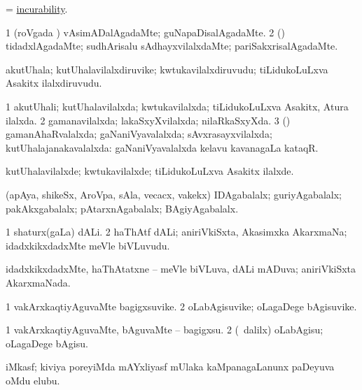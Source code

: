 \bentry
{}
\gl{\nA}
\bmng
 = \hyperlink{incurability}{incurability}. 
\emng
\eentry

\bentry
{}
\gl{\kirxvi}
\bmng
\bnum
\num{1} (roVgada \vi) vAsimADalAgadaMte; guNapaDisalAgadaMte. 
\num{2} (\rUpa) tidadxlAgadaMte; sudhArisalu sAdhayxvilalxdaMte; pariSakxrisalAgadaMte. 
\enum
\emng
\eentry

\bentry
{}
\gl{\nA}
\bmng
akutUhala; kutUhalavilalxdiruvike; kwtukavilalxdiruvudu; tiLidukoLuLxva Asakitx ilalxdiruvudu. 
\emng
\eentry

\bentry
{}
\gl{\gu}
\bmng
\bnum
\num{1} akutUhali; kutUhalavilalxda; kwtukavilalxda; tiLidukoLuLxva Asakitx, Atura ilalxda. 
\num{2} gamanavilalxda; lakaSxyXvilalxda; nilaRkaSxyXda. 
\num{3} (\viparx) gamanAhaRvalalxda; gaNaniVyavalalxda; sAvxrasayxvilalxda; kutUhalajanakavalalxda:  gaNaniVyavalalxda kelavu kavanagaLa kataqR. 
\enum
\emng
\eentry

\bentry
{}
\gl{\kirxvi}
\bmng
kutUhalavilalxde; kwtukavilalxde; tiLidukoLuLxva Asakitx ilalxde. 
\emng
\eentry

\bentry
{}
\gl{\gu}
\bmng
(apAya, shikeSx, AroVpa, sAla, vecacx, \mo vakekx) IDAgabalalx; guriyAgabalalx; pakAkxgabalalx; pAtarxnAgabalalx; BAgiyAgabalalx. 
\emng
\eentry

\bentry
{}
\gl{\nA}
\bmng
\bnum
\num{1} shaturx(gaLa) dALi. 
\num{2} haThAtf dALi; aniriVkiSxta, Akasimxka AkarxmaNa; idadxkikxdadxMte meVle biVLuvudu. 
\enum
\emng
\eentry

\bentry
{}
\gl{\gu}
\bmng
idadxkikxdadxMte, haThAtatxne -- meVle biVLuva, dALi mADuva; aniriVkiSxta AkarxmaNada. 
\emng
\eentry

\bentry
{}
\gl{\nA}
\bmng
\bnum
\num{1} vakArxkaqtiyAguvaMte bagigxsuvike. 
\num{2} oLabAgisuvike; oLagaDege bAgisuvike. 
\enum
\emng
\eentry

\bentry
{}
\gl{\sakirx}
\bmng
\bnum
\num{1} vakArxkaqtiyAguvaMte, bAguvaMte -- bagigxsu. 
\num{2} (\kanmu\ \BUkaq dalilx) oLabAgisu; oLagaDege bAgisu. 
\enum
\emng
\eentry

\bentry
{}
\gl{\nA}
\bmng
iMkasf; kiviya poreyiMda mAYxliyasf mUlaka kaMpanagaLanunx paDeyuva oMdu elubu. 
\emng
\eentry

